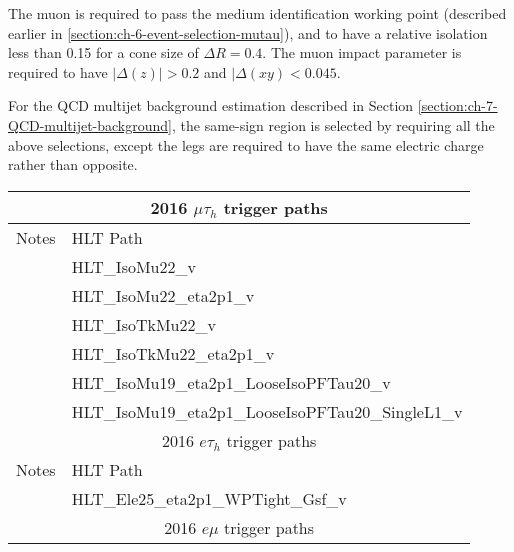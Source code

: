 The muon is required to pass the medium identification working point (described earlier in \ref{section:ch-6-event-selection-mutau}), and to have a relative isolation less than 0.15 for a cone size of $\Delta R = 0.4$. The muon impact parameter is required to have $|\Delta(z)| > 0.2$ and $|\Delta(xy) < 0.045$. 

For the QCD multijet background estimation described in Section \ref{section:ch-7-QCD-multijet-background}, the same-sign region is selected by requiring all the above selections, except the legs are required to have the same electric charge rather than opposite.


\begin{table}[h]
    \centering
    \begin{tabular}{ll}
    \hline
    \multicolumn{2}{|c|}{\footnotesize{2016 $\mu\tau_{h}$ trigger paths}}                                     \\ \hline
    \footnotesize{Notes}          & \footnotesize{HLT Path}                                           \\ \hline
                                  & \footnotesize{HLT\_IsoMu22\_v}                                    \\
                                  & \footnotesize{HLT\_IsoMu22\_eta2p1\_v}                            \\
                                  & \footnotesize{HLT\_IsoTkMu22\_v}                                  \\
                                  & \footnotesize{HLT\_IsoTkMu22\_eta2p1\_v}                          \\
                                  & \footnotesize{HLT\_IsoMu19\_eta2p1\_LooseIsoPFTau20\_v}           \\
                                  & \footnotesize{HLT\_IsoMu19\_eta2p1\_LooseIsoPFTau20\_SingleL1\_v} \\ \hline
    \multicolumn{2}{|c|}{\footnotesize{2016  $e\tau_{h}$ trigger paths}}                                         \\ \hline
    \footnotesize{Notes}          & \footnotesize{HLT Path}                                           \\ \hline
                                  & \footnotesize{HLT\_Ele25\_eta2p1\_WPTight\_Gsf\_v}                \\ \hline
    \multicolumn{2}{|c|}{\footnotesize{2016 $e\mu$ trigger paths}}                                            \\ \hline

\end{tabular}
\end{table}
